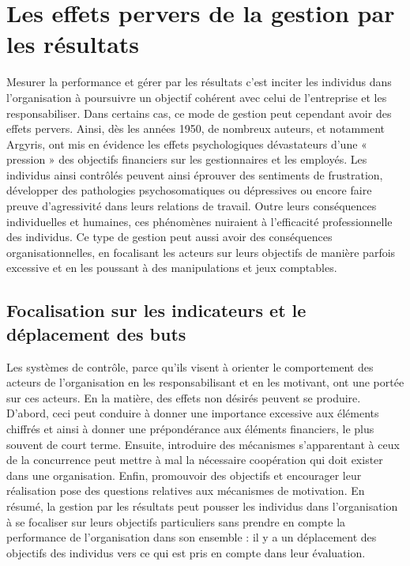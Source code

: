 \documentclass[oneside]{kaobook}
\begin{document}
\section{Les effets pervers de la gestion par les résultats}
\label{sec:orgdcc0759}
Mesurer la performance et gérer par les résultats c’est inciter les individus dans l’organisation à poursuivre un objectif cohérent avec celui de l’entreprise et les responsabiliser. Dans certains cas, ce mode de gestion peut cependant avoir des effets pervers. Ainsi, dès les années 1950, de nombreux auteurs, et notamment Argyris, ont mis en évidence les effets psychologiques dévastateurs d’une « pression » des objectifs financiers sur les gestionnaires et les employés. Les individus ainsi contrôlés peuvent ainsi éprouver des sentiments de frustration, développer des pathologies psychosomatiques ou dépressives ou encore faire preuve d’agressivité dans leurs relations de travail. Outre leurs conséquences individuelles et humaines, ces phénomènes nuiraient à l’efficacité professionnelle des individus. Ce type de gestion peut aussi avoir des conséquences organisationnelles, en focalisant les acteurs sur leurs objectifs de manière parfois excessive et en les poussant à des manipulations et jeux comptables.
\subsection{Focalisation sur les indicateurs et le déplacement des buts}
\label{sec:org00081ae}
Les systèmes de contrôle, parce qu’ils visent à orienter le comportement des acteurs de l’organisation en les responsabilisant et en les motivant, ont une portée sur ces acteurs. En la matière, des effets non désirés peuvent se produire. D’abord, ceci peut conduire à donner une importance excessive aux éléments chiffrés et ainsi à donner une prépondérance aux éléments financiers, le plus souvent de court terme. Ensuite, introduire des mécanismes s’apparentant à ceux de la concurrence peut mettre à mal la nécessaire coopération qui doit exister dans une organisation. Enfin, promouvoir des objectifs et encourager leur réalisation pose des questions relatives aux mécanismes de motivation. En résumé, la gestion par les résultats peut pousser les individus dans l’organisation à se focaliser sur leurs objectifs particuliers sans prendre en compte la performance de l’organisation dans son ensemble : il y a un déplacement des objectifs des individus vers ce qui est pris en compte dans leur évaluation.
\end{document}
